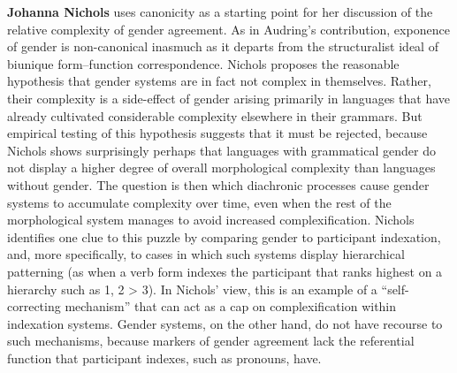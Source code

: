 \documentclass[output=collectionpaper]{langsci/langscibook}
\begin{document}
\textbf{Johanna Nichols} uses canonicity as a starting point for her discussion of the relative complexity of gender agreement. As in Audring’s contribution, exponence of gender is non-canonical inasmuch as it departs from the structuralist ideal of biunique form--function correspondence. Nichols proposes the reasonable hypothesis that gender systems are in fact not complex in themselves. Rather, their complexity is a side-effect of gender arising primarily in languages that have already cultivated considerable complexity elsewhere in their grammars. But empirical testing of this hypothesis suggests that it must be rejected, because Nichols shows \textendash{} surprisingly perhaps \textendash{} that languages with grammatical gender do not display a higher degree of overall morphological complexity than languages without gender. The question is then which diachronic processes cause gender systems to accumulate complexity over time, even when the rest of the morphological system manages to avoid increased complexification. Nichols identifies one clue to this puzzle by comparing gender to participant indexation, and, more specifically, to cases in which such systems display hierarchical patterning (as when a verb form indexes the participant that ranks highest on a hierarchy such as 1, 2 > 3). In Nichols’ view, this is an example of a ``self-correcting mechanism'' that can act as a cap on complexification within indexation systems. Gender systems, on the other hand, do not have recourse to such mechanisms, because markers of gender agreement lack the referential function that participant indexes, such as pronouns, have.
\end{document}
